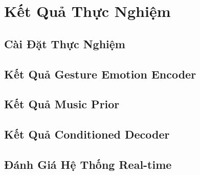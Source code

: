 ﻿\chapter{Kết Quả Thực Nghiệm}
\label{chap:exp}
\section{Cài Đặt Thực Nghiệm}
\section{Kết Quả Gesture Emotion Encoder}
\section{Kết Quả Music Prior}
\section{Kết Quả Conditioned Decoder}
\section{Đánh Giá Hệ Thống Real-time}
